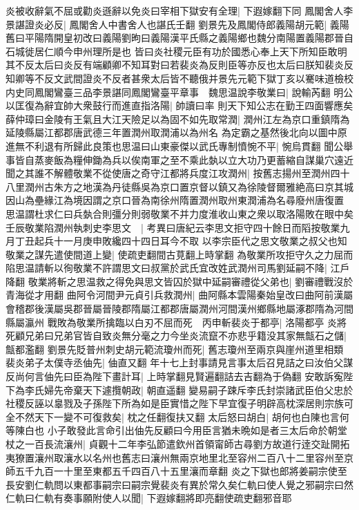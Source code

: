 炎被收辭氣不屈或勸炎遜辭以免炎曰宰相下獄安有全理|{
	下遐嫁翻下同}
鳳閣舍人李景諶證炎必反|{
	鳳閣舍人中書舍人也諶氏壬翻}
劉景先及鳳閣侍郎義陽胡元範|{
	義陽舊曰平陽隋開皇初改曰義陽劉昫曰義陽漢平氏縣之義陽鄉也魏分南陽置義陽郡晉自石城徙居仁順今申州理所是也}
皆曰炎社稷元臣有功於國悉心奉上天下所知臣敢明其不反太后曰炎反有端顧卿不知耳對曰若裴炎為反則臣等亦反也太后曰朕知裴炎反知卿等不反文武間證炎不反者甚衆太后皆不聽俄并景先元範下獄丁亥以騫味道檢校内史同鳳閣鸞臺三品李景諶同鳳閣鸞臺平章事　魏思温說李敬業曰|{
	說輸芮翻}
明公以匡復為辭宜帥大衆鼓行而進直指洛陽|{
	帥讀曰率}
則天下知公志在勤王四面響應矣薛仲璋曰金陵有王氣且大江天險足以為固不如先取常潤|{
	潤州江左為京口重鎮隋為延陵縣屬江都郡唐武德三年置潤州取潤浦以為州名}
為定霸之基然後北向以圖中原進無不利退有所歸此良策也思温曰山東豪傑以武氏專制憤惋不平|{
	惋烏貫翻}
聞公舉事皆自蒸麥飯為糧伸鋤為兵以俟南軍之至不乘此埶以立大功乃更蓄縮自謀巢穴遠近聞之其誰不解體敬業不從使唐之奇守江都將兵度江攻潤州|{
	按舊志揚州至潤州四十八里潤州古朱方之地漢為丹徒縣吳為京口置京督以鎮又為徐陵督爾雅絶高曰京其城因山為壘緣江為境因謂之京口晉為南徐州隋置潤州取州東潤浦為名尋廢州唐復置}
思温謂杜求仁曰兵埶合則彊分則弱敬業不并力度淮收山東之衆以取洛陽敗在眼中矣壬辰敬業陷潤州執刺史李思文　|{
	考異曰唐紀云李思文拒守四十餘日而䧟按敬業九月丁丑起兵十一月庚申敗纔四十四日耳今不取}
以李宗臣代之思文敬業之叔父也知敬業之謀先遣使間道上變|{
	使疏吏翻間古莧翻上時掌翻}
為敬業所攻拒守久之力屈而陷思温請斬以徇敬業不許謂思文曰叔黨於武氏宜改姓武潤州司馬劉延嗣不降|{
	江戶降翻}
敬業將斬之思温救之得免與思文皆囚於獄中延嗣審禮從父弟也|{
	劉審禮戰沒於青海從才用翻}
曲阿令河間尹元貞引兵救潤州|{
	曲阿縣本雲陽秦始皇改曰曲阿前漢屬會稽郡後漢屬吳郡晉屬晉陵郡隋屬江都郡唐屬潤州河間漢州鄉縣地屬涿郡隋為河間縣屬瀛州}
戰敗為敬業所擒臨以白刃不屈而死　丙申斬裴炎于都亭|{
	洛陽都亭}
炎將死顧兄弟曰兄弟官皆自致炎無分毫之力今坐炎流竄不亦悲乎籍没其家無甔石之儲|{
	甔都濫翻}
劉景先貶普州刺史胡元範流瓊州而死|{
	舊志瓊州至兩京與崖州道里相類}
裴炎弟子太僕寺丞伷先|{
	伷直又翻}
年十七上封事請見言事太后召見詰之曰汝伯父謀反尚何言伷先曰臣為陛下畫計耳|{
	上時掌翻見賢遍翻詰去吉翻為于偽翻}
安敢訴寃陛下為李氏婦先帝棄天下遽攬朝政|{
	朝直遥翻}
變易嗣子踈斥李氏封崇諸武臣伯父忠於社稷反誣以辠戮及子孫陛下所為如是臣實惜之陛下早宜復子明辟高枕深居則宗族可全不然天下一變不可復救矣|{
	枕之任翻復扶又翻}
太后怒曰胡白|{
	胡何也白陳也言何等陳白也}
小子敢發此言命引出伷先反顧曰今用臣言猶未晩如是者三太后命於朝堂杖之一百長流瀼州|{
	貞觀十二年李弘節遣欽州首領甯師古尋劉方故道行逹交趾開拓夷獠置瀼州取瀼水以名州也舊志曰瀼州無兩京地里北至容州二百八十二里容州至京師五千九百一十里至東都五千四百八十五里瀼而章翻}
炎之下獄也郎將姜嗣宗使至長安劉仁軌問以東都事嗣宗曰嗣宗覺裴炎有異於常久矣仁軌曰使人覺之邪嗣宗曰然仁軌曰仁軌有奏事願附使人以聞|{
	下遐嫁翻將即亮翻使疏吏翻邪音耶}

